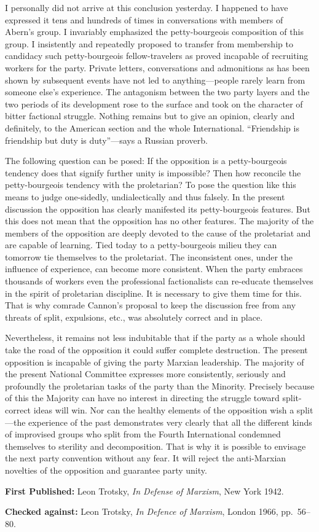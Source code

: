 I personally did not arrive at this conclusion yesterday. I happened to have expressed it tens and hundreds of times in conversations with members of Abern’s group. I invariably emphasized the petty-bourgeois composition of this group. I insistently and repeatedly proposed to transfer from membership to candidacy such petty-bourgeois fellow-travelers as proved incapable of recruiting workers for the party. Private letters, conversations and admonitions as has been shown by subsequent events have not led to anything---people rarely learn from someone else’s experience. The antagonism between the two party layers and the two periods of its development rose to the surface and took on the character of bitter factional struggle. Nothing remains but to give an opinion, clearly and definitely, to the American section and the whole International. “Friendship is friendship but duty is duty”---says a Russian proverb.

The following question can be posed: If the opposition is a petty-bourgeois tendency does that signify further unity is impossible? Then how reconcile the petty-bourgeois tendency with the proletarian? To pose the question like this means to judge one-sidedly, undialectically and thus falsely. In the present discussion the opposition has clearly manifested its petty-bourgeois features. But this does not mean that the opposition has no other features. The majority of the members of the opposition are deeply devoted to the cause of the proletariat and are capable of learning. Tied today to a petty-bourgeois milieu they can tomorrow tie themselves to the proletariat. The inconsistent ones, under the influence of experience, can become more consistent. When the party embraces thousands of workers even the professional factionalists can re-educate themselves in the spirit of proletarian discipline. It is necessary to give them time for this. That is why comrade Cannon’s proposal to keep the discussion free from any threats of split, expulsions, etc., was absolutely correct and in place.

Nevertheless, it remains not less indubitable that if the party as a whole should take the road of the opposition it could suffer complete destruction. The present opposition is incapable of giving the party Marxian leadership. The majority of the present National Committee expresses more consistently, seriously and profoundly the proletarian tasks of the party than the Minority. Precisely because of this the Majority can have no interest in directing the struggle toward split-correct ideas will win. Nor can the healthy elements of the opposition wish a split---the experience of the past demonstrates very clearly that all the different kinds of improvised groups who split from the Fourth International condemned themselves to sterility and decomposition. That is why it is possible to envisage the next party convention without any fear. It will reject the anti-Marxian novelties of the opposition and guarantee party unity.

\begin{letterinfo}
  \textbf{First Published:} Leon Trotsky, \emph{In Defense of Marxism}, New York 1942.
  
  \textbf{Checked against:} Leon Trotsky, \emph{In Defence of Marxism}, London 1966, pp.~56--80.
\end{letterinfo}